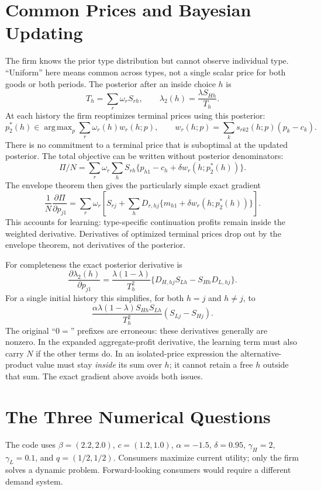 \documentclass[12pt]{article}
\theoremstyle{definition}
\theoremstyle{remark}
\DeclareMathOperator{\argmax}{arg\,max}
\numberwithin{equation}{section}
\begin{document}
\section{Common Prices and Bayesian Updating}
The firm knows the prior type distribution but cannot observe individual type.
``Uniform'' here means common across types, not a single scalar price for both
goods or both periods. The posterior after an inside choice $h$ is
\[
 T_h=\sum_r\omega_r S_{rh},\qquad
 \lambda_2(h)=\frac{\lambda S_{Hh}}{T_h}.
\]
At each history the firm reoptimizes terminal prices using this posterior:
\[
 p_2^*(h)\in\argmax_p\sum_r\omega_r(h)w_r(h;p),\qquad
 w_r(h;p)=\sum_ks_{rk2}(h;p)(p_k-c_k).
\]
There is no commitment to a terminal price that is suboptimal at the updated
posterior. The total objective can be written without posterior denominators:
\[
 \Pi/N=\sum_r\omega_r\sum_h S_{rh}
                 \{p_{h1}-c_h+\delta w_r(h;p_2^*(h))\}.
\]
The envelope theorem then gives the particularly simple exact gradient
\[
 \frac{1}{N}\frac{\partial\Pi}{\partial p_{j1}}
 =\sum_r\omega_r\left[S_{rj}
       +\sum_hD_{r,hj}\{m_{h1}+\delta w_r(h;p_2^*(h))\}\right].
\]
This accounts for learning: type-specific continuation profits remain inside
the weighted derivative. Derivatives of optimized terminal prices drop out by
the envelope theorem, not derivatives of the posterior.

For completeness the exact posterior derivative is
\[
 \frac{\partial\lambda_2(h)}{\partial p_{j1}}
 =\frac{\lambda(1-\lambda)}{T_h^2}
       \{D_{H,hj}S_{Lh}-S_{Hh}D_{L,hj}\}.
\]
For a single initial history this simplifies, for both $h=j$ and $h\ne j$, to
\[
 \frac{\alpha\lambda(1-\lambda)S_{Hh}S_{Lh}}{T_h^2}
       (S_{Lj}-S_{Hj}).
\]
The original ``$0=$'' prefixes are erroneous: these derivatives generally are
nonzero. In the expanded aggregate-profit derivative, the learning term must
also carry $N$ if the other terms do. In an isolated-price expression the
alternative-product value must stay \emph{inside} its sum over $h$; it cannot
retain a free $h$ outside that sum. The exact gradient above avoids both issues.

\section{The Three Numerical Questions}
The code uses $\beta=(2.2,2.0)$, $c=(1.2,1.0)$, $\alpha=-1.5$,
$\delta=0.95$, $\gamma_H=2$, $\gamma_L=0.1$, and $q=(1/2,1/2)$.
Consumers maximize current utility; only the firm solves a dynamic problem.
Forward-looking consumers would require a different demand system.
\end{document}
